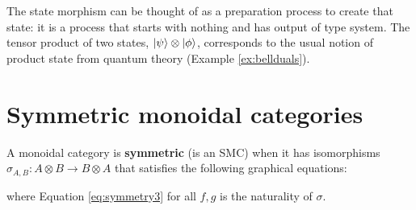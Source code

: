 \noindent The state morphism can be thought of as a preparation process to create that state: it is a process that starts with nothing and has output of type system. The tensor product of two states, $| \psi \rangle\otimes| \phi \rangle$, corresponds to the usual notion of product state from quantum theory (Example \ref{ex:bellduals}).

\section{Symmetric monoidal categories}

\begin{defn}
A monoidal category is \textbf{symmetric} (is an SMC) when it has  isomorphisms
$\sigma_{A,B}:A\otimes B\to B\otimes A$ that satisfies the following graphical equations:
\begin{equation}
\label{eq:symmetry}

\end{equation}
\begin{equation}
\label{eq:symmetry2}

\end{equation}
\begin{equation}
\label{eq:symmetry3}

\end{equation}
\end{defn}
\noindent where Equation \ref{eq:symmetry3} for all $f,g$ is the naturality of $\sigma$.

